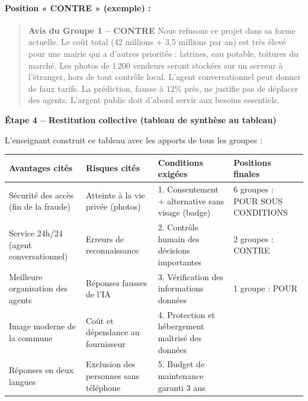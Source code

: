 \documentclass[11pt]{article}
\begin{document}
\begin{exoresolu}
\paragraph{Position « CONTRE » (exemple) :}
\begin{quote}
\textbf{Avis du Groupe 1 -- CONTRE}
Nous refusons ce projet dans sa forme actuelle. Le coût total (42 millions + 3,5 millions par an) est très élevé pour une mairie qui a d'autres priorités : latrines, eau potable, toitures du marché. Les photos de 1\,200 vendeurs seront stockées sur un serveur à l'étranger, hors de tout contrôle local. L'agent conversationnel peut donner de faux tarifs. La prédiction, fausse à $12\%$ près, ne justifie pas de déplacer des agents. L'argent public doit d'abord servir aux besoins essentiels.
\end{quote}

\textbf{Étape 4 -- Restitution collective (tableau de synthèse au tableau)}

L'enseignant construit ce tableau avec les apports de tous les groupes :

\begin{center}
\begin{tabularx}{\linewidth}{|X|X|X|X|}
\hline
\rowcolor{popblueL}
\textbf{Avantages cités} & \textbf{Risques cités} & \textbf{Conditions exigées} & \textbf{Positions finales} \\
\hline
Sécurité des accès (fin de la fraude) & Atteinte à la vie privée (photos) & 1. Consentement + alternative sans visage (badge) & 6 groupes : POUR SOUS CONDITIONS \\
Service 24h/24 (agent conversationnel) & Erreurs de reconnaissance & 2. Contrôle humain des décisions importantes & 2 groupes : CONTRE \\
Meilleure organisation des agents & Réponses fausses de l'IA & 3. Vérification des informations données & 1 groupe : POUR \\
Image moderne de la commune & Coût et dépendance au fournisseur & 4. Protection et hébergement maîtrisé des données & \\
Réponses en deux langues & Exclusion des personnes sans téléphone & 5. Budget de maintenance garanti 3 ans & \\
\hline
\end{tabularx}
\end{center}


\end{exoresolu}
\end{document}
